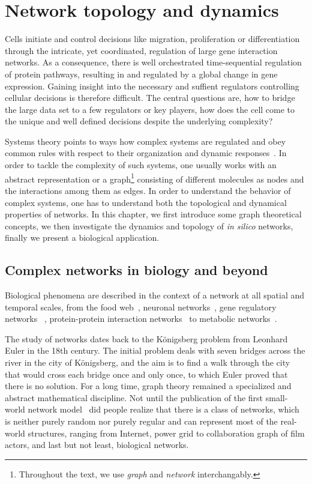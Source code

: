 \chapter{Network topology and dynamics}
\label{chap:network}

Cells initiate and control decisions like migration, proliferation or differentiation through the intricate, yet
coordinated, regulation of large gene interaction networks. 
As a consequence, there is  well orchestrated time-sequential regulation of protein pathways, resulting in and regulated by a  global change in gene expression.
Gaining insight into the necessary and suffient regulators controlling cellular decisions  is therefore difficult. 
The central questions are, how to bridge the large data set to a few regulators or key players, how does the cell come to the unique and well defined decisions despite the underlying complexity?

Systems theory points to ways how complex systems are regulated and obey common rules with respect to their organization and dynamic responses~\citep{Kauffman1993}. 
In order to tackle the complexity of such systems, 
one usually works with
an abstract
representation or a graph\footnote{Throughout the text, we use \emph{graph} and \emph{network} interchangably.} consisting of different molecules as nodes and the 
interactions among them as edges. In order to understand the
behavior of complex systems, one has to understand both
the topological and dynamical properties of networks. In this chapter, we first
introduce some graph theoretical concepts, we then investigate the dynamics and
topology of \emph{in silico} networks, finally we present a biological application.

\section{Complex networks in biology and beyond}
Biological phenomena are described in the context of a network
at all spatial and temporal scales, from the food web~\citep{Williams2000}, 
neuronal networks~\citep{White1986,Bullmore2009}, gene regulatory networks~%
\citep{Kauffman1969,Gama-Castro2008,Abdulrehman2011},
protein-protein interaction networks~\citep{Jeong2001,Stelzl2005}
to metabolic networks~\citep{Herrgaard2008}.

The study of networks dates back to the K\"onigsberg
problem from Leonhard Euler in the 18th century. The initial
problem deals with seven bridges across the river in the city
of K\"onigsberg, and the aim is to find a walk through the 
city that would cross each bridge once and only once, to which
Euler proved that there is no solution. For a long time,
graph theory remained a specialized and abstract mathematical 
discipline. Not until the publication of the first 
small-world network model~\citep{Watts1998} did people
realize that there is a class of networks, which is neither
purely random nor purely regular and can represent most of
the real-world structures, ranging from Internet, power grid
to collaboration graph of film actors, and last but not least, 
biological networks.

